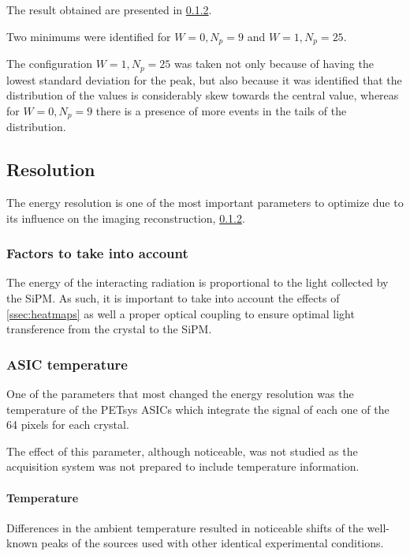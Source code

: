 The result obtained are presented in \ref{}.

Two minimums were identified for $W=0, N_p=9$ and $W=1, N_p=25$.

The configuration $W=1, N_p=25$ was taken not only because of having the lowest standard deviation for the peak, but also because it was identified that the distribution of the values is considerably skew towards the central value, whereas for $W=0, N_p=9$ there is a presence of more events in the tails of the distribution.

\subsection{Resolution}\label{ssec:resolution}

The energy resolution is one of the most important parameters to optimize due to its influence on the imaging reconstruction, \ref{}.

\subsubsection{Factors to take into account}

The energy of the interacting radiation is proportional to the light collected by the \ac{SiPM}. As such, it is important to take into account the effects of \ref{ssec:heatmaps} as well a proper optical coupling to ensure optimal light transference from the crystal to the \ac{SiPM}.

\subsubsection{ASIC temperature}

One of the parameters that most changed the energy resolution was the temperature of the PETsys \ac{ASIC}s which integrate the signal of each one of the 64 pixels for each crystal.

The effect of this parameter, although noticeable, was not studied as the acquisition system was not prepared to include temperature information.

\paragraph*{Temperature}

Differences in the ambient temperature resulted in noticeable shifts of the well-known peaks of the sources used with other identical experimental conditions.

